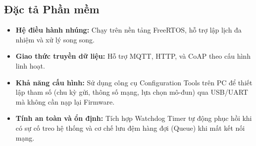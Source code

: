 \subsection{Đặc tả Phần mềm}
    \begin{itemize}
        \item \textbf{Hệ điều hành nhúng:} Chạy trên nền tảng FreeRTOS, hỗ trợ lập lịch đa nhiệm và xử lý song song.
        \item \textbf{Giao thức truyền dữ liệu:} Hỗ trợ MQTT, HTTP, và CoAP theo cấu hình linh hoạt.
        \item \textbf{Khả năng cấu hình:} Sử dụng công cụ Configuration Tools trên PC để thiết lập tham số (chu kỳ gửi, thông số mạng, lựa chọn mô-đun) qua USB/UART mà không cần nạp lại Firmware.
        \item \textbf{Tính an toàn và ổn định:} Tích hợp Watchdog Timer tự động phục hồi khi có sự cố treo hệ thống và cơ chế lưu đệm hàng đợi (Queue) khi mất kết nối mạng.
    \end{itemize}